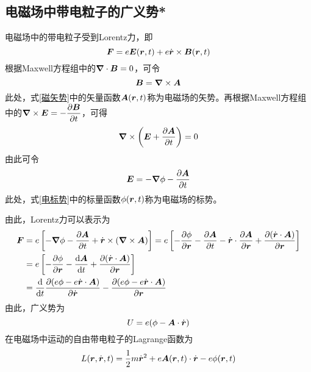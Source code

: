 \subsection{电磁场中带电粒子的广义势*}\label{chapter2:subsection-电磁场中带电粒子的广义势能}

电磁场中的带电粒子受到Lorentz力，即
\begin{equation}
	\boldsymbol{F} = e\boldsymbol{E}(\boldsymbol{r},t) + e\dot{\boldsymbol{r}} \times \boldsymbol{B}(\boldsymbol{r},t)
\end{equation}
根据Maxwell方程组中的$\boldsymbol{\nabla} \cdot \boldsymbol{B} = 0$，可令
\begin{equation}
	\boldsymbol{B} = \boldsymbol{\nabla} \times \boldsymbol{A}
	\label{磁矢势}
\end{equation}
此处，式\eqref{磁矢势}中的矢量函数$\boldsymbol{A}(\boldsymbol{r},t)$称为{\heiti 电磁场的矢势}。再根据Maxwell方程组中的$\displaystyle \boldsymbol{\nabla} \times \boldsymbol{E} = -\frac{\partial \boldsymbol{B}}{\partial t}$，可得
\begin{equation*}
	\boldsymbol{\nabla} \times \left(\boldsymbol{E} + \frac{\partial \boldsymbol{A}}{\partial t}\right) = 0
\end{equation*}
由此可令
\begin{equation}
	\boldsymbol{E} = -\boldsymbol{\nabla} \phi - \frac{\partial \boldsymbol{A}}{\partial t}
	\label{电标势}
\end{equation}
此处，式\eqref{电标势}中的标量函数$\phi(\boldsymbol{r},t)$称为{\heiti 电磁场的标势}。

由此，Lorentz力可以表示为
\begin{align}
	\boldsymbol{F} & = e\left[-\boldsymbol{\nabla} \phi - \frac{\partial \boldsymbol{A}}{\partial t} + \dot{\boldsymbol{r}} \times (\boldsymbol{\nabla} \times \boldsymbol{A})\right] = e\left[-\frac{\partial \phi}{\partial \boldsymbol{r}} - \frac{\partial \boldsymbol{A}}{\partial t} - \dot{\boldsymbol{r}} \cdot \frac{\partial \boldsymbol{A}}{\partial \boldsymbol{r}} + \frac{\partial (\dot{\boldsymbol{r}} \cdot \boldsymbol{A})}{\partial \boldsymbol{r}}\right] \nonumber \\
	& = e\left[-\frac{\partial \phi}{\partial \boldsymbol{r}} - \frac{\mathrm{d} \boldsymbol{A}}{\mathrm{d} t} + \frac{\partial (\dot{\boldsymbol{r}} \cdot \boldsymbol{A})}{\partial \boldsymbol{r}}\right] \nonumber \\
	& = \frac{\mathrm{d}}{\mathrm{d} t} \frac{\partial (e\phi - e\dot{\boldsymbol{r}}\cdot \boldsymbol{A})}{\partial \dot{\boldsymbol{r}}} - \frac{\partial (e\phi - e\dot{\boldsymbol{r}}\cdot \boldsymbol{A})}{\partial \boldsymbol{r}}
\end{align}
由此，广义势为
\begin{equation}
	U = e(\phi - \boldsymbol{A} \cdot \dot{\boldsymbol{r}})
	\label{电磁场中带电粒子的广义势}
\end{equation}
在电磁场中运动的自由带电粒子的Lagrange函数为
\begin{equation}
	L(\boldsymbol{r},\dot{\boldsymbol{r}},t) = \frac12 m \dot{\boldsymbol{r}}^2 + e\boldsymbol{A}(\boldsymbol{r},t) \cdot \dot{\boldsymbol{r}} - e\phi(\boldsymbol{r},t)
	\label{电磁场中点电粒子的Lagrange函数}
\end{equation}

